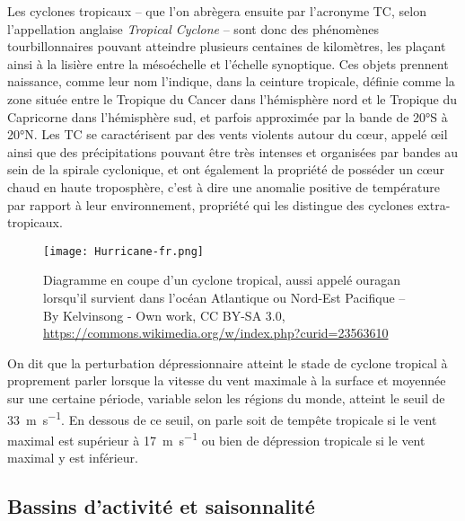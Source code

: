 \documentclass[../main.tex]{subfiles}
\begin{document}
Les cyclones tropicaux -- que l'on abrègera ensuite par l'acronyme TC, selon l'appellation anglaise \textit{Tropical Cyclone} -- sont donc des phénomènes tourbillonnaires pouvant atteindre plusieurs centaines de kilomètres, les plaçant ainsi à la lisière entre la mésoéchelle et l'échelle synoptique. Ces objets prennent naissance, comme leur nom l'indique, dans la ceinture tropicale, définie comme la zone située entre le Tropique du Cancer dans l'hémisphère nord et le Tropique du Capricorne dans
l'hémisphère sud, et parfois approximée par la bande de \ang{20}S à \ang{20}N. Les TC se caractérisent par des vents violents autour du cœur, appelé œil ainsi que des précipitations pouvant être très intenses et organisées par bandes au sein de la spirale cyclonique, et ont également la propriété de posséder un cœur chaud en haute troposphère, c'est à dire une anomalie positive de température par rapport à leur environnement, propriété qui les distingue des cyclones extra-tropicaux.

\begin{figure}[t]
    \centering
    \texttt{[image: Hurricane-fr.png]}
    \caption{Diagramme en coupe d'un cyclone tropical, aussi appelé ouragan lorsqu'il survient dans l'océan Atlantique ou Nord-Est Pacifique -- By Kelvinsong - Own work, CC BY-SA 3.0, \url{https://commons.wikimedia.org/w/index.php?curid=23563610}}
    \label{fig:diagramme_TC}
\end{figure}

On dit que la perturbation dépressionnaire atteint le stade de cyclone tropical à proprement parler lorsque la vitesse du vent maximale à la surface et moyennée sur une certaine période, variable selon les régions du monde, atteint le seuil de \SI{33}{\metre\per\second}. En dessous de ce seuil, on parle soit de tempête tropicale si le vent maximal est supérieur à \SI{17}{\metre\per\second} ou bien de dépression tropicale si le vent maximal y est inférieur.

\subsection{Bassins d'activité et saisonnalité}
\end{document}
